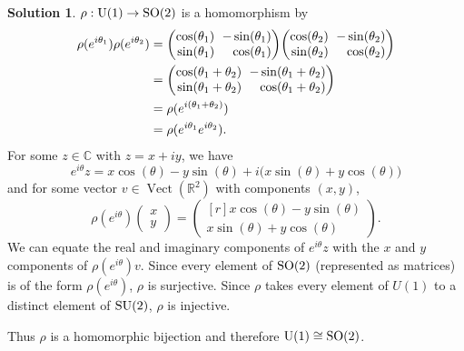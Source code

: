 \documentclass[11pt, a4paper]{report}
\theoremstyle{definition}
\newtheorem{solution}{Solution}[part]
\newenvironment{sol}{\begin{solution}}{\end{solution}\pagebreak[3]}
\newcommand*{\settightmatrix}{\ensuremath\setlength{\arraycolsep}{0.7ex}}
\newenvironment{tightmatrix}
    {\settightmatrix}{}
\newcommand*{\SO}{\ensuremath\text{SO}}
\newcommand*{\U}{\ensuremath\text{U}}
\newcommand*{\SU}{\ensuremath\text{SU}}
\DeclareMathOperator{\Vect}{Vect}
\begin{document}
\begin{sol}

$\rho: \U(1) \to \SO(2)$ is a homomorphism by
\begin{align*}
    \rho(e^{i\theta_1}) \rho(e^{i\theta_2})
        &=
        \begin{tightmatrix}\begin{pmatrix*}[r]
            \cos(\theta_1) & -\sin(\theta_1) \\
            \sin(\theta_1) & \cos(\theta_1)
        \end{pmatrix*}\end{tightmatrix}
        \begin{tightmatrix}\begin{pmatrix*}[r]
            \cos(\theta_2) & -\sin(\theta_2) \\
            \sin(\theta_2) & \cos(\theta_2)
        \end{pmatrix*}\end{tightmatrix} \\
        &=
        \begin{tightmatrix}\begin{pmatrix*}[r]
            \cos(\theta_1 + \theta_2) & -\sin(\theta_1 + \theta_2) \\
            \sin(\theta_1 + \theta_2) & \cos(\theta_1 + \theta_2)
        \end{pmatrix*}\end{tightmatrix} \\
        &= \rho(e^{i(\theta_1 + \theta_2)}) \\
        &= \rho(e^{i\theta_1}e^{i\theta_2}).
\end{align*}
For some $z \in \mathbb{C}$ with $z = x + iy$, we have
\[
    e^{i\theta} z = x \cos(\theta) - y \sin(\theta) + i \bigl( x \sin(\theta) + y \cos(\theta) \bigr)
\]
and for some vector $v \in \Vect(\mathbb{R}^2)$ with components $(x, y)$,
\[
    \rho(e^{i\theta}) \begin{pmatrix} x \\ y \end{pmatrix}
        = \begin{pmatrix*}[r]
            x \cos(\theta) - y \sin(\theta) \\
            x \sin(\theta) + y \cos(\theta)
        \end{pmatrix*}.
\]
We can equate the real and imaginary components of $e^{i\theta} z$ with the $x$ and $y$ components of $\rho(e^{i\theta}) v$.
Since every element of $\SO(2)$ (represented as matrices) is of the form $\rho(e^{i\theta})$, $\rho$ is surjective.
Since $\rho$ takes every element of $U(1)$ to a distinct element of $\SU(2)$, $\rho$ is injective.

Thus $\rho$ is a homomorphic bijection and therefore $\U(1) \cong \SO(2)$.

\end{sol}
\end{document}
